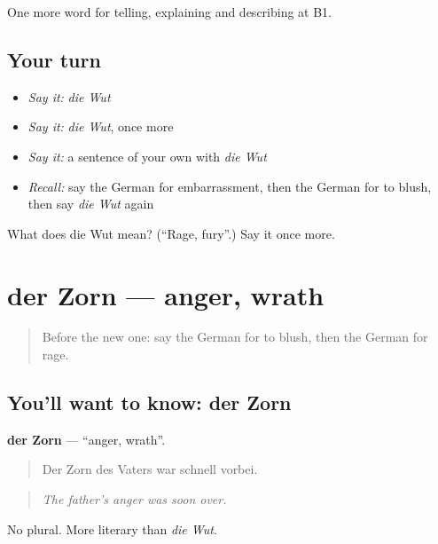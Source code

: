 \begin{grammarlens}[title={What you've built}]
One more word for telling, explaining and describing at B1.
\end{grammarlens}

\subsection*{Your turn}
\begin{itemize}
\raggedright
  \item \emph{Say it:} \emph{die Wut}
  \item \emph{Say it:} \emph{die Wut}, once more
  \item \emph{Say it:} a sentence of your own with \emph{die Wut}
  \item \emph{Recall:} say the German for embarrassment, then the German for to blush, then say \emph{die Wut} again
\end{itemize}

\begin{tcolorbox}[breakable,colback=teal!4,colframe=teal!35!black,title={Before you move on}]
What does die Wut mean? (\textquotedblleft{}Rage, fury\textquotedblright{}.) Say it once more.
\end{tcolorbox}
\section[der Zorn]{der Zorn — anger, wrath}

\label{lesson:GE-C468-zorn}



\begin{quote}
Before the new one: say the German for to blush, then the German for rage.
\end{quote}

\subsection*{You'll want to know: der Zorn}
\textbf{der Zorn} — \textquotedblleft{}anger, wrath\textquotedblright{}.

\begin{quote}
Der Zorn des Vaters war schnell vorbei.
\end{quote}

\begin{quote}
\emph{The father's anger was soon over.}
\end{quote}

No plural. More literary than \emph{die Wut}.

